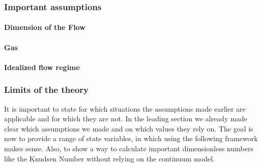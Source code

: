 \subsubsection{Important assumptions}

\paragraph{Dimension of the Flow}

\paragraph{Gas}

\paragraph{Idealized flow regime}

\newpage

\subsubsection{Limits of the theory}
It is important to state for which situations the assumptions made earlier are applicable and for which they are not. In the leading section we already made clear which assumptions we made  and on which values they rely on. The goal is now to provide a range of state variables, in which using the following framework makes sense. Also, to show a way to calculate important dimensionless numbers like the Knudsen Number without relying on the continuum model.
